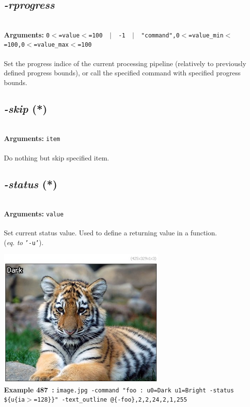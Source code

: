 \documentclass[a4paper,11pt,twoside]{book}
\begin{document}
\subsection{\emph{-rprogress} }\vspace*{-0.5em}
~\\\textbf{Arguments: } 
{\small \texttt{0$<$=value$<$=100 ~$|$~ -1 ~$|$~ "command",0$<$=value\_min$<$=100,0$<$=value\_max$<$=100}}\\~\\
Set the progress indice of the current processing pipeline (relatively to
previously defined progress bounds), or call the specified command with
specified progress bounds.


\subsection{\emph{-skip} (*)}\vspace*{-0.5em}
~\\\textbf{Arguments: } 
{\small \texttt{item}}\\~\\
Do nothing but skip specified item.


\subsection{\emph{-status} (*)}\vspace*{-0.5em}
~\\\textbf{Arguments: } 
{\small \texttt{value}}\\~\\
Set current status value. Used to define a returning value in a function.
~\\(\emph{eq. to} {\small \texttt{'-u'}}).
\begin{center}\includegraphics[keepaspectratio=true,height=7cm,width=\textwidth]{img/gmic_def487.jpg}\\
{\footnotesize \textbf{Example 487~:} \texttt{image.jpg -command "foo : u0=Dark u1=Bright -status \$\{u\{ia$>$=128\}\}" -text\_outline @\{-foo\},2,2,24,2,1,255}}
\end{center}
\end{document}

